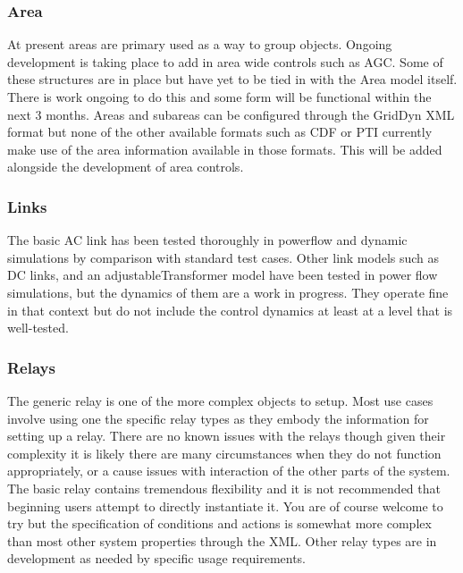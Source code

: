 \documentclass[12pt]{article} %
\begin{document}
\subsubsection{Area}
At present areas are primary used as a way to group objects.  Ongoing development is taking place to add in area wide controls such as AGC.  Some of these structures are in place but have yet to be tied in with the Area model itself.  There is work ongoing to do this and some form will be functional within the next 3 months.  Areas and subareas can be configured through the GridDyn XML format but none of the other available formats such as CDF or PTI currently make use of the area information available in those formats.  This will be added alongside the development of area controls.

\subsubsection{Links}
The basic AC link has been tested thoroughly in powerflow and dynamic simulations by comparison with standard test cases.  Other link models such as DC links, and an adjustableTransformer model have been tested in power flow simulations, but the dynamics of them are a work in progress.  They operate fine in that context but do not include the control dynamics at least at a level that is well-tested.

\subsubsection{Relays}
The generic relay is one of the more complex objects to setup.  Most use cases involve using one the specific relay types as they embody the information for setting up a relay.  There are no known issues with the relays though given their complexity it is likely there are many circumstances when they do not function appropriately, or a cause issues with interaction of the other parts of the system.  The basic relay contains tremendous flexibility and it is  not recommended that beginning users attempt to directly instantiate it.  You are of course welcome to try but the specification of conditions and actions is somewhat more complex than most other system properties through the XML.  Other relay types are in development as needed by specific usage requirements.
\end{document}
